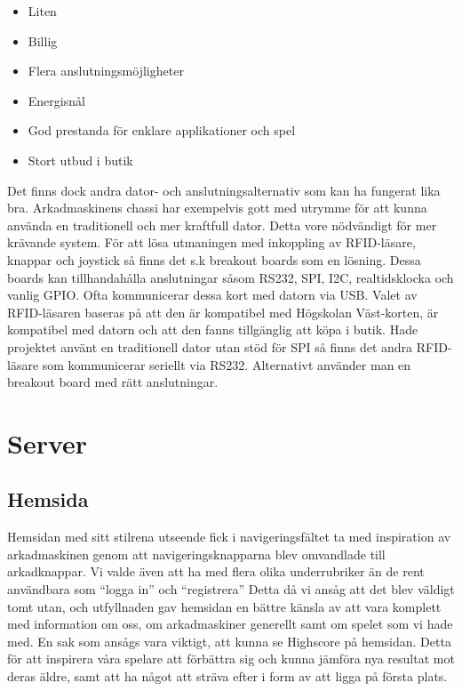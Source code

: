 \documentclass[12pt,fleqn,openany]{book} %
\begin{document}
\begin{itemize}
 \item Liten
 \item Billig
 \item Flera anslutningsmöjligheter
 \item Energisnål
 \item God prestanda för enklare applikationer och spel
 \item Stort utbud i butik
\end{itemize}
\bigskip

Det finns dock andra dator- och anslutningsalternativ som kan ha fungerat lika bra. Arkadmaskinens chassi har exempelvis gott med utrymme 
för att kunna använda en traditionell och mer kraftfull dator. Detta vore nödvändigt för mer krävande system. För att lösa utmaningen med 
inkoppling av RFID-läsare, knappar och joystick så finns det s.k breakout boards som en lösning. Dessa boards kan tillhandahålla anslutningar 
såsom RS232, SPI, I2C, realtidsklocka och vanlig GPIO. Ofta kommunicerar dessa kort med datorn via USB. Valet av RFID-läsaren baseras på att 
den är kompatibel med Högskolan Väst-korten, är kompatibel med datorn och att den fanns tillgänglig att köpa i butik. Hade projektet använt 
en traditionell dator utan stöd för SPI så finns det andra RFID-läsare som kommunicerar seriellt via RS232. Alternativt använder man en 
breakout board med rätt anslutningar.

\section{Server}

\subsection{Hemsida}

Hemsidan med sitt stilrena utseende fick i navigeringsfältet ta med inspiration av arkadmaskinen genom att navigeringsknapparna blev 
omvandlade till arkadknappar. Vi valde även att ha med flera olika underrubriker än de rent användbara som “logga in” och “registrera” 
Detta då vi ansåg att det blev väldigt tomt utan, och utfyllnaden gav hemsidan en bättre känsla av att vara komplett med information om 
oss, om arkadmaskiner generellt samt om spelet som vi hade med. En sak som ansågs vara viktigt, att kunna se Highscore på hemsidan. 
Detta för att inspirera våra spelare att förbättra sig och kunna jämföra nya resultat mot deras äldre, samt att ha något att sträva 
efter i form av att ligga på första plats.
\end{document}
